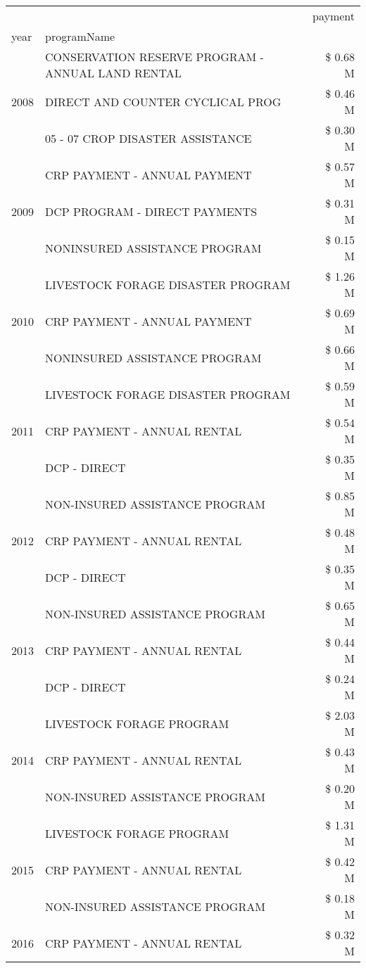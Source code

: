 \begin{tabular}{llr}
\toprule
 &  & payment \\
year & programName &  \\
\midrule
\multirow[t]{3}{*}{2008} & CONSERVATION RESERVE PROGRAM - ANNUAL LAND RENTAL & \$ 0.68 M \\
 & DIRECT AND COUNTER CYCLICAL PROG & \$ 0.46 M \\
 & 05 - 07 CROP DISASTER ASSISTANCE & \$ 0.30 M \\
\cline{1-3}
\multirow[t]{3}{*}{2009} & CRP PAYMENT - ANNUAL PAYMENT & \$ 0.57 M \\
 & DCP PROGRAM - DIRECT PAYMENTS & \$ 0.31 M \\
 & NONINSURED ASSISTANCE PROGRAM & \$ 0.15 M \\
\cline{1-3}
\multirow[t]{3}{*}{2010} & LIVESTOCK FORAGE DISASTER  PROGRAM & \$ 1.26 M \\
 & CRP PAYMENT - ANNUAL PAYMENT & \$ 0.69 M \\
 & NONINSURED ASSISTANCE PROGRAM & \$ 0.66 M \\
\cline{1-3}
\multirow[t]{3}{*}{2011} & LIVESTOCK FORAGE DISASTER PROGRAM & \$ 0.59 M \\
 & CRP PAYMENT - ANNUAL RENTAL & \$ 0.54 M \\
 & DCP - DIRECT & \$ 0.35 M \\
\cline{1-3}
\multirow[t]{3}{*}{2012} & NON-INSURED ASSISTANCE PROGRAM & \$ 0.85 M \\
 & CRP PAYMENT - ANNUAL RENTAL & \$ 0.48 M \\
 & DCP - DIRECT & \$ 0.35 M \\
\cline{1-3}
\multirow[t]{3}{*}{2013} & NON-INSURED ASSISTANCE PROGRAM & \$ 0.65 M \\
 & CRP PAYMENT - ANNUAL RENTAL & \$ 0.44 M \\
 & DCP - DIRECT & \$ 0.24 M \\
\cline{1-3}
\multirow[t]{3}{*}{2014} & LIVESTOCK FORAGE PROGRAM & \$ 2.03 M \\
 & CRP PAYMENT - ANNUAL RENTAL & \$ 0.43 M \\
 & NON-INSURED ASSISTANCE PROGRAM & \$ 0.20 M \\
\cline{1-3}
\multirow[t]{3}{*}{2015} & LIVESTOCK FORAGE PROGRAM & \$ 1.31 M \\
 & CRP PAYMENT - ANNUAL RENTAL & \$ 0.42 M \\
 & NON-INSURED ASSISTANCE PROGRAM & \$ 0.18 M \\
\cline{1-3}
\multirow[t]{3}{*}{2016} & CRP PAYMENT - ANNUAL RENTAL & \$ 0.32 M \\

\end{tabular}
